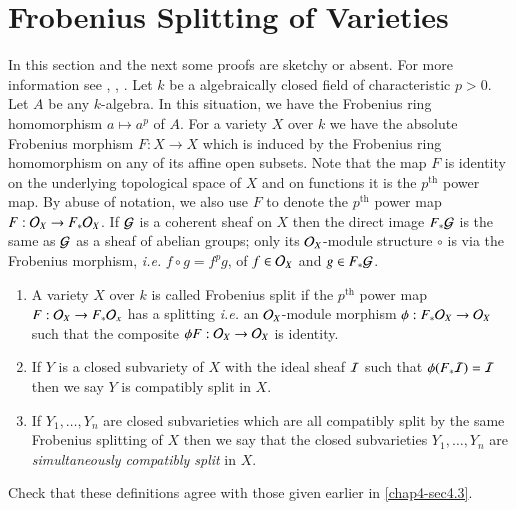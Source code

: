 \section{Frobenius Splitting of Varieties}\label{sec-A.1}

In this section and the next some proofs are sketchy or absent. For
more information see \cite{key32}, \cite{key24}, \cite{key31}. Let $k$
be a algebraically closed field of characteristic $p>0$. Let $A$ be
any $k$-algebra. In this situation, we have the Frobenius ring
homomorphism $a\mapsto a^{p}$ of $A$. For a variety $X$ over $k$ we
have the absolute Frobenius morphism $F:X\to X$ which is induced by
the Frobenius ring homomorphism on any of its affine open
subsets. Note that the map $F$ is identity on the underlying
topological space of $X$ and on functions it is the $p^{\text{th}}$ power
map. By abuse of notation, we also use $F$ to denote the $p^{\text{th}}$ power
map $F:\mathcal{O}_{X}\to F_{\ast}\mathcal{O}_{X}$. If $\mathcal{G}$ is a coherent sheaf on $X$
then the direct image $F_{\ast}\mathcal{G}$ is the same as $\mathcal{G}$ as a sheaf of
abelian groups; only its $\mathcal{O}_{X}$-module structure $\circ$ is via the
Frobenius morphism, {\em i.e.} $f\circ g=f^{p}g$, of $f\in \mathcal{O}_{X}$ and
$g\in F_{\ast}\mathcal{G}$.

\begin{definition}\label{defi-A.1.1}
\begin{enumerate}
\item A variety $X$ over $k$ is called Frobenius split if the $p^{\text{th}}$
  power map $F:\mathcal{O}_{X}\to F_{\ast}\mathcal{O}_{x}$ has a splitting {\em i.e.} an
  $\mathcal{O}_{X}$-module morphism $\phi:F_{\ast}\mathcal{O}_{X}\to
  \mathcal{O}_{X}$\pageoriginale such\label{page76} that the composite $\phi F:\mathcal{O}_{X}\to
  \mathcal{O}_{X}$ is identity.

\item If $Y$ is a closed subvariety of $X$ with the ideal sheaf $\mathcal{I}$
  such that $\phi(F_{\ast}\mathcal{I})=\mathcal{I}$ then we say $Y$ is compatibly split
  in $X$.

\item If $Y_{1},\ldots,Y_{n}$ are closed subvarieties which are all
  compatibly split by the same Frobenius splitting of $X$ then we say
  that the closed subvarieties $Y_{1},\ldots,Y_{n}$ are {\em
    simultaneously compatibly split} in $X$.
\end{enumerate}
\end{definition}

\begin{exercise}\label{exer-A.1.2}
Check that these definitions agree with those given earlier in
\ref{chap4-sec4.3}. 
\end{exercise}

